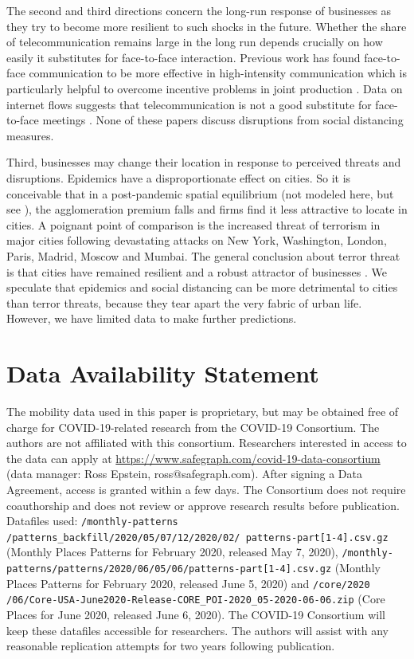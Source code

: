 \documentclass[10pt,letterpaper]{article}
\begin{document}
The second and third directions concern the long-run response of businesses as they try to become more resilient to such shocks in the future. Whether the share of telecommunication remains large in the long run depends crucially on how easily it substitutes for face-to-face interaction. Previous work has found face-to-face communication to be more effective in high-intensity communication which is particularly helpful to overcome incentive problems in joint production \cite{Gaspar1998-gy,Storper2004-mg}. Data on internet flows suggests that telecommunication is not a good substitute for face-to-face meetings \cite{Cuberes2013-js}. None of these papers discuss disruptions from social distancing measures. 

Third, businesses may change their location in response to perceived threats and disruptions. Epidemics have a disproportionate effect on cities. So it is conceivable that in a post-pandemic spatial equilibrium (not modeled here, but see \cite{Tian2019-wq}), the agglomeration premium falls and firms find it less attractive to locate in cities. A poignant point of comparison is the increased threat of terrorism in major cities following devastating attacks on New York, Washington, London, Paris, Madrid, Moscow and Mumbai. The general conclusion about terror threat is that cities have remained resilient and a robust attractor of businesses \cite{Glaeser2002-mw,Harrigan2002-ik}. We speculate that epidemics and social distancing can be more detrimental to cities than terror threats, because they tear apart the very fabric of urban life. However, we have limited data to make further predictions.

\section*{Data Availability Statement}
The mobility data used in this paper \cite{SafeGraph2020-gn} is proprietary, but may be obtained free of charge for COVID-19-related research from the COVID-19 Consortium. The authors are not affiliated with this consortium. Researchers interested in access to the data can apply at \url{https://www.safegraph.com/covid-19-data-consortium} (data manager: Ross Epstein, ross@safegraph.com). After signing a Data Agreement, access is granted within a few days. The Consortium does not require coauthorship and does not review or approve research results before publication. Datafiles used: \texttt{/monthly-patterns /patterns\_backfill/2020/05/07/12/2020/02/ patterns-part[1-4].csv.gz} (Monthly Places Patterns for February 2020, released May 7, 2020), \texttt{/monthly-patterns/patterns/2020/06/05/06/patterns-part[1-4].csv.gz} (Monthly Places Patterns for February 2020, released June 5, 2020) and \texttt{/core/2020 /06/Core-USA-June2020-Release-CORE\_POI-2020\_05-2020-06-06.zip} (Core Places for June 2020, released June 6, 2020). The COVID-19 Consortium will keep these datafiles accessible for researchers. The authors will assist with any reasonable replication attempts for two years following publication.
\end{document}
